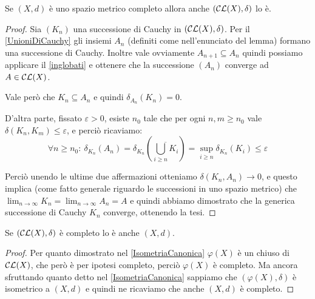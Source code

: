 \begin{theorem} \label{CompletezzaCL}
	Se $(X,d)$ è uno spazio metrico completo allora anche $(\mathcal{CL}(X),\delta)$ lo è.
\end{theorem}
\begin{proof}
	Sia $(K_n)$ una successione di Cauchy in $(\mathcal{CL}(X),\delta)$.
	Per il \cref{UnioniDiCauchy} gli insiemi $A_n$ (definiti come nell'enunciato del lemma) formano una successione di Cauchy.
	Inoltre vale ovviamente $A_{n+1}\subseteq A_n$ quindi possiamo applicare il \cref{inglobati} e ottenere che la successione $(A_n)$ converge ad $A\in\mathcal{CL}(X)$.
	
	Vale però che $K_n\subseteq A_n$ e quindi $\delta_{A_n}(K_n)=0$.
	
	D'altra parte, fissato $\varepsilon > 0$, esiste $n_0$ tale che per ogni $n,m\ge n_0$ vale $\delta(K_n,K_m)\le \varepsilon$, e perciò ricaviamo:
	\begin{equation*}
		\forall n\ge n_0:\ \delta_{K_n}(A_n)=\delta_{K_n}\left(\overline{\bigcup_{i\ge n} K_i}\right)
		=\sup_{i\ge n}\delta_{K_n}(K_i)\le \varepsilon
	\end{equation*}
	
	Perciò unendo le ultime due affermazioni otteniamo $\delta(K_n,A_n)\to 0$, e questo implica (come fatto generale riguardo le successioni in uno spazio metrico) che $\lim_{n\to\infty}K_n=\lim_{n\to\infty}A_n=A$ e quindi abbiamo dimostrato che la generica successione di Cauchy $K_n$ converge, ottenendo la tesi.
\end{proof}

\begin{remark}\label{CompletezzaInverso}
Se $\left (\mathcal{CL}(X),\delta \right ) $ è completo lo è anche $(X,d)$.
\end{remark}
\begin{proof}
Per quanto dimostrato nel \cref{IsometriaCanonica} $\varphi(X)$ è un chiuso di $\mathcal{CL}(X)$, che però è per ipotesi completo, perciò $\varphi(X)$ è completo. Ma ancora sfruttando quanto detto nel \cref{IsometriaCanonica} sappiamo che $(\varphi(X),\delta)$ è isometrico a $(X,d)$ e quindi ne ricaviamo che anche $(X,d)$ è completo.
\end{proof}
